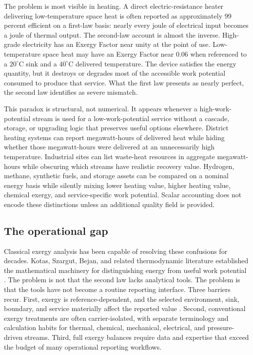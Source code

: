 \documentclass[11pt]{article}
\newcommand{\degC}{^{\circ}\mathrm{C}}
\begin{document}
The problem is most visible in heating. A direct electric-resistance heater delivering low-temperature space heat is often reported as approximately 99 percent efficient on a first-law basis: nearly every joule of electrical input becomes a joule of thermal output. The second-law account is almost the inverse. High-grade electricity has an Exergy Factor near unity at the point of use. Low-temperature space heat may have an Exergy Factor near 0.06 when referenced to a $20\degC$ sink and a $40\degC$ delivered temperature. The device satisfies the energy quantity, but it destroys or degrades most of the accessible work potential consumed to produce that service. What the first law presents as nearly perfect, the second law identifies as severe mismatch.

This paradox is structural, not numerical. It appears whenever a high-work-potential stream is used for a low-work-potential service without a cascade, storage, or upgrading logic that preserves useful options elsewhere. District heating systems can report megawatt-hours of delivered heat while hiding whether those megawatt-hours were delivered at an unnecessarily high temperature. Industrial sites can list waste-heat resources in aggregate megawatt-hours while obscuring which streams have realistic recovery value. Hydrogen, methane, synthetic fuels, and storage assets can be compared on a nominal energy basis while silently mixing lower heating value, higher heating value, chemical exergy, and service-specific work potential. Scalar accounting does not encode these distinctions unless an additional quality field is provided.

\subsection*{The operational gap}

Classical exergy analysis has been capable of resolving these confusions for decades. Kotas, Szargut, Bejan, and related thermodynamic literature established the mathematical machinery for distinguishing energy from useful work potential \cite{kotas1985,szargut2005,bejan2016}. The problem is not that the second law lacks analytical tools. The problem is that the tools have not become a routine reporting interface. Three barriers recur. First, exergy is reference-dependent, and the selected environment, sink, boundary, and service materially affect the reported value \cite{gaudreau2012}. Second, conventional exergy treatments are often carrier-isolated, with separate terminology and calculation habits for thermal, chemical, mechanical, electrical, and pressure-driven streams. Third, full exergy balances require data and expertise that exceed the budget of many operational reporting workflows.
\end{document}
